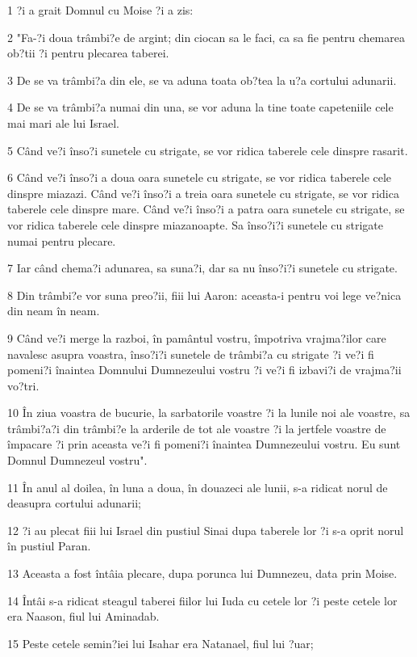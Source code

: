 \par 1 ?i a grait Domnul cu Moise ?i a zis:
\par 2 "Fa-?i doua trâmbi?e de argint; din ciocan sa le faci, ca sa fie pentru chemarea ob?tii ?i pentru plecarea taberei.
\par 3 De se va trâmbi?a din ele, se va aduna toata ob?tea la u?a cortului adunarii.
\par 4 De se va trâmbi?a numai din una, se vor aduna la tine toate capeteniile cele mai mari ale lui Israel.
\par 5 Când ve?i înso?i sunetele cu strigate, se vor ridica taberele cele dinspre rasarit.
\par 6 Când ve?i înso?i a doua oara sunetele cu strigate, se vor ridica taberele cele dinspre miazazi. Când ve?i înso?i a treia oara sunetele cu strigate, se vor ridica taberele cele dinspre mare. Când ve?i înso?i a patra oara sunetele cu strigate, se vor ridica taberele cele dinspre miazanoapte. Sa înso?i?i sunetele cu strigate numai pentru plecare.
\par 7 Iar când chema?i adunarea, sa suna?i, dar sa nu înso?i?i sunetele cu strigate.
\par 8 Din trâmbi?e vor suna preo?ii, fiii lui Aaron: aceasta-i pentru voi lege ve?nica din neam în neam.
\par 9 Când ve?i merge la razboi, în pamântul vostru, împotriva vrajma?ilor care navalesc asupra voastra, înso?i?i sunetele de trâmbi?a cu strigate ?i ve?i fi pomeni?i înaintea Domnului Dumnezeului vostru ?i ve?i fi izbavi?i de vrajma?ii vo?tri.
\par 10 În ziua voastra de bucurie, la sarbatorile voastre ?i la lunile noi ale voastre, sa trâmbi?a?i din trâmbi?e la arderile de tot ale voastre ?i la jertfele voastre de împacare ?i prin aceasta ve?i fi pomeni?i înaintea Dumnezeului vostru. Eu sunt Domnul Dumnezeul vostru".
\par 11 În anul al doilea, în luna a doua, în douazeci ale lunii, s-a ridicat norul de deasupra cortului adunarii;
\par 12 ?i au plecat fiii lui Israel din pustiul Sinai dupa taberele lor ?i s-a oprit norul în pustiul Paran.
\par 13 Aceasta a fost întâia plecare, dupa porunca lui Dumnezeu, data prin Moise.
\par 14 Întâi s-a ridicat steagul taberei fiilor lui Iuda cu cetele lor ?i peste cetele lor era Naason, fiul lui Aminadab.
\par 15 Peste cetele semin?iei lui Isahar era Natanael, fiul lui ?uar;
